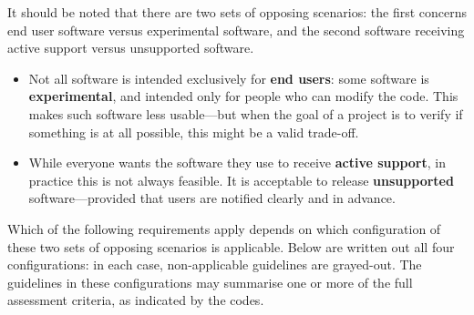 \documentclass[a4paper,11pt]{article}
\begin{document}
It should be noted that there are two sets of opposing scenarios: the first
concerns end user software versus experimental software, and the second
software receiving active support versus unsupported software.  

\begin{itemize}
	\item Not all software is intended exclusively for \textbf{end users}: some software is \textbf{experimental}, and intended only for people who can modify the code. This makes such software less usable---but when the goal of a project is to verify if something is at all possible, this might be a valid trade-off.
	\item While everyone wants the software they use to receive \textbf{active support}, in practice this is not always feasible. It is acceptable to release \textbf{unsupported} software---provided that users are notified clearly and in advance.
\end{itemize} 

Which of the following requirements apply depends on which configuration of
these two sets of opposing scenarios is applicable.  Below are written out all four configurations: in each case, non-applicable guidelines are grayed-out. 
The guidelines in these configurations may summarise one or more of the full assessment criteria, as indicated by the codes.
\end{document}
